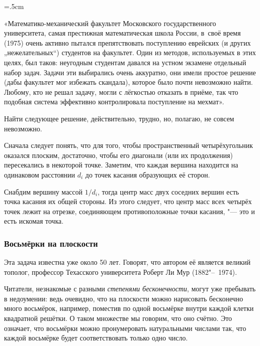 \documentclass[twoside]{book}
\begin{document}
\medskip

\begin{trivlist}\leftskip=5mm\rightskip=.5cm
  \small
\item\relax«Математико-механический факультет Московского государственного университета, самая престижная математическая школа России, в~своё время (1975) очень активно пытался препятствовать поступлению еврейских (и других „нежелательных“) студентов на факультет.
Один из методов, используемых в этих целях, был таков: неугодным студентам давался на устном экзамене отдельный набор задач.
Задачи эти выбирались очень аккуратно, они имели простое решение (дабы факультет мог избежать скандала), которое было почти невозможно найти.
Любому, кто не решал задачу, могли с лёгкостью отказать в приёме, так что подобная система эффективно контролировала поступление на мехмат». 
\end{trivlist}

\medskip

Найти следующее решение, действительно, трудно, но, полагаю, не совсем невозможно.

\medskip

Сначала следует понять, что для того, чтобы пространственный четырёхугольник оказался плоским, достаточно, чтобы его диагонали (или их продолжения) пересекались в некоторой точке.
Заметим, что каждая вершина  находится на одинаковом расстоянии $d_i$ до точек касания образующих её сторон.

Снабдим вершину  массой $1/d_i$, тогда центр масс двух соседних вершин есть точка касания их общей стороны.
Из этого следует, что центр масс всех четырёх точек лежит на отрезке, соединяющем противоположные точки касания, "--- это и есть искомая точка.
\heart

\subsubsection*{Восьмёрки на плоскости}%

Эта задача известна уже около 50 лет.
Говорят, что автором её является великий тополог, профессор Техасского университета Роберт Ли Мур (1882"--~1974). %

Читатели, незнакомые с разными \emph{степенями бесконечности}, могут уже пребывать в недоумении: ведь очевидно, что на плоскости можно нарисовать бесконечно много восьмёрок, например, поместив по одной восьмёрке внутри каждой клетки квадратной решётки.
О таком множестве мы говорим, что оно счётно. 
Это означает, что восьмёрки можно пронумеровать натуральными числами так, что каждой восьмёрке будет соответствовать только одно число.
\end{document}

